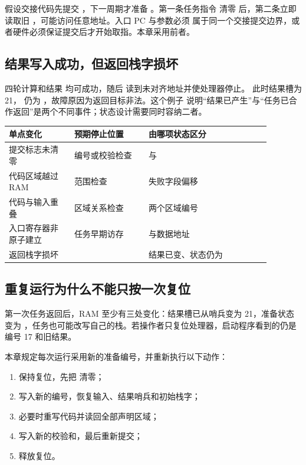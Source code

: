 假设交接代码先提交 ，下一周期才准备 。第一条任务指令
清零  后，第二条立即读取旧 ，可能访问任意地址。入口 PC 与参数必须
属于同一个交接提交边界，或者硬件必须保证提交后才开始取指。本章采用前者。

\subsection{结果写入成功，但返回栈字损坏}

四轮计算和结果  均可成功，随后  读到未对齐地址并使处理器停止。
此时结果槽为 21， 仍为 ，故障原因为返回目标非法。这个例子
说明“结果已产生”与“任务已合作返回”是两个不同事件；状态设计需要同时容纳二者。

\begin{longtable}{|L{0.22\linewidth}|L{0.25\linewidth}|L{0.41\linewidth}|}
\hline
{}
单点变化 & 预期停止位置 & 由哪项状态区分 \\ \hline
提交标志未清零 & 编号或校验检查 &  与  \\ \hline
代码区域越过 RAM & 范围检查 & 失败字段偏移 \\ \hline
代码与输入重叠 & 区域关系检查 & 两个区域编号 \\ \hline
入口寄存器非原子建立 & 任务早期访存 &  与数据地址 \\ \hline
返回栈字损坏 &  & 结果已变、状态仍为  \\ \hline
\end{longtable}

\subsection{重复运行为什么不能只按一次复位}

第一次任务返回后，RAM 至少有三处变化：结果槽已从哨兵变为 21，准备状态变为
，任务也可能改写自己的栈。若操作者只复位处理器，启动程序看到的仍是
编号 17 和旧结果。

本章规定每次运行采用新的准备编号，并重新执行以下动作：

\begin{enumerate}
\item 保持复位，先把  清零；
\item 写入新的编号，恢复输入、结果哨兵和初始栈字；
\item 必要时重写代码并读回全部声明区域；
\item 写入新的校验和，最后重新提交；
\item 释放复位。
\end{enumerate}


